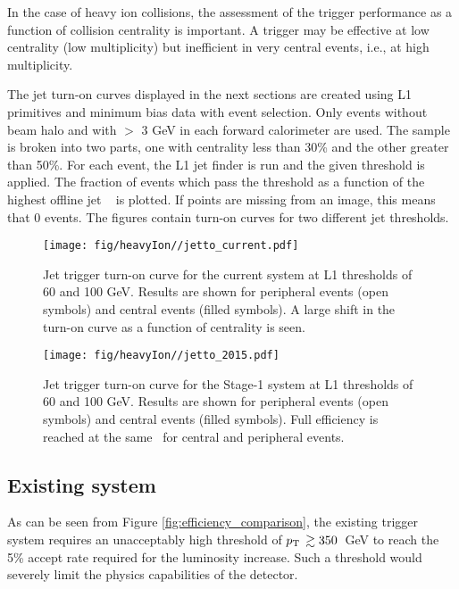 In the case of heavy ion collisions, the assessment of the trigger performance
as a function of collision centrality is important. 
A trigger may be effective at low centrality (low multiplicity) but
inefficient in very central events, i.e., at high multiplicity. 

The jet turn-on curves displayed in the next sections are created using L1 primitives and
minimum bias data with event selection. 
Only events without beam halo and with $>$ 3 GeV in each forward calorimeter
are used. The sample is broken into two parts, 
one with centrality less than 30\% and the other greater than 50\%. For each
event, the L1 jet finder is run and the given threshold is applied. 
The fraction of events which pass the threshold as a function of the highest
offline jet \pt\ 
 is plotted. If points are missing from an image, this means that 0 events. The figures contain
 turn-on curves for two different jet thresholds.

\begin{figure}[htbp]
\begin{center}
\texttt{[image: fig/heavyIon//jetto\_current.pdf]}
\caption{Jet trigger turn-on curve for the current system at L1 thresholds of 60 and 100
GeV. Results are shown for peripheral events (open symbols) and central events (filled symbols).
A large shift in the turn-on curve as a function of centrality is seen.}
\label{fig:jetto_current}
\end{center}
\end{figure}

\begin{figure}[htbp]
\begin{center}
\texttt{[image: fig/heavyIon//jetto\_2015.pdf]}
\caption{Jet trigger turn-on curve for the Stage-1 system at L1 thresholds of 60 and 100
GeV. Results are shown for peripheral events (open symbols) and central events (filled symbols).
Full efficiency is reached at the same \pt\ for central and peripheral events.}
\label{fig:jetto_2015}
\end{center}
\end{figure}

\subsection{Existing system}

As can be seen from Figure \ref{fig:efficiency_comparison}, the existing
trigger system requires an unacceptably high threshold of $p_{\rm T}\, \gtrsim 350$~GeV to 
reach the 5\% accept rate required for the luminosity increase. Such a
threshold would severely limit the physics capabilities of the detector. 

